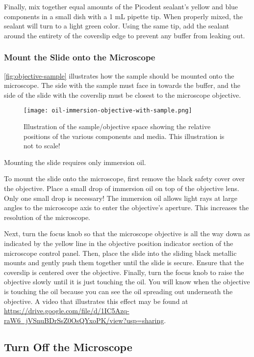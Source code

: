 \documentclass[10pt,a4paper,oneside]{book}
\begin{document}
Finally, mix together equal amounts of the Picodent sealant's yellow and blue components in a small dish with a 1 mL pipette tip. When properly mixed, the sealant will turn to a light green color. Using the same tip, add the sealant around the entirety of the coverslip edge to prevent any buffer from leaking out.

\subsubsection{Mount the Slide onto the Microscope}

\autoref{fig:objective-sample} illustrates how the sample should be mounted onto the microscope. The side with the sample must face in towards the buffer, and the side of the slide with the coverslip must be closest to the microscope objective.

\begin{figure}[ht]
    \centering
    \texttt{[image: oil-immersion-objective-with-sample.png]}
    \caption{Illustration of the sample/objective space showing the relative positions of the various components and media. This illustration is not to scale!}
    \label{fig:objective-sample}
\end{figure}

Mounting the slide requires only immersion oil.

To mount the slide onto the microscope, first remove the black safety cover over the objective. Place a small drop of immersion oil on top of the objective lens. Only one small drop is necessary! The immersion oil allows light rays at large angles to the microscope axis to enter the objective's aperture. This increases the resolution of the microscope.

Next, turn the focus knob so that the microscope objective is all the way down as indicated by the yellow line in the objective position indicator section of the microscope control panel. Then, place the slide into the sliding black metallic mounts and gently push them together until the slide is secure. Ensure that the coverslip is centered over the objective. Finally, turn the focus knob to raise the objective slowly until it is just touching the oil. You will know when the objective is touching the oil because you can see the oil spreading out underneath the objective. A video that illustrates this effect may be found at \url{https://drive.google.com/file/d/1IC5Azq-raW6_jVSnuBDrSsZ0OsQYxoPK/view?usp=sharing}.

\subsection{Turn Off the Microscope}
\end{document}
